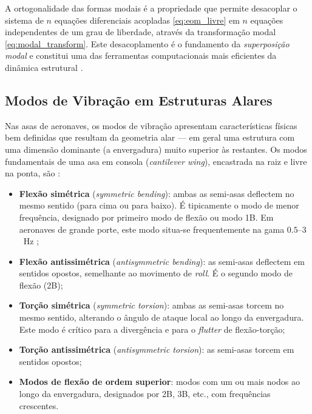 \documentclass[11pt,twoside,a4paper]{report}
\begin{document}
A ortogonalidade das formas modais é a propriedade que permite desacoplar o sistema de $n$ equações diferenciais acopladas \eqref{eq:eom_livre} em $n$ equações independentes de um grau de liberdade, através da transformação modal \eqref{eq:modal_transform}. Este desacoplamento é o fundamento da \textit{superposição modal} e constitui uma das ferramentas computacionais mais eficientes da dinâmica estrutural \cite{Craig2006}.

\subsection{Modos de Vibração em Estruturas Alares}

Nas asas de aeronaves, os modos de vibração apresentam características físicas bem definidas que resultam da geometria alar --- em geral uma estrutura com uma dimensão dominante (a envergadura) muito superior às restantes. Os modos fundamentais de uma asa em consola (\textit{cantilever wing}), encastrada na raiz e livre na ponta, são \cite{Bisplinghoff1996, Wright2015}:

\begin{itemize}
    \item \textbf{Flexão simétrica} (\textit{symmetric bending}): ambas as semi-asas deflectem no mesmo sentido (para cima ou para baixo). É tipicamente o modo de menor frequência, designado por primeiro modo de flexão ou modo 1B. Em aeronaves de grande porte, este modo situa-se frequentemente na gama $0.5$--$3$~\si{\hertz} \cite{Megson2012};

    \item \textbf{Flexão antissimétrica} (\textit{antisymmetric bending}): as semi-asas deflectem em sentidos opostos, semelhante ao movimento de \textit{roll}. É o segundo modo de flexão (2B);

    \item \textbf{Torção simétrica} (\textit{symmetric torsion}): ambas as semi-asas torcem no mesmo sentido, alterando o ângulo de ataque local ao longo da envergadura. Este modo é crítico para a divergência e para o \textit{flutter} de flexão-torção;

    \item \textbf{Torção antissimétrica} (\textit{antisymmetric torsion}): as semi-asas torcem em sentidos opostos;

    \item \textbf{Modos de flexão de ordem superior}: modos com um ou mais nodos ao longo da envergadura, designados por 2B, 3B, etc., com frequências crescentes.
\end{itemize}
\end{document}
